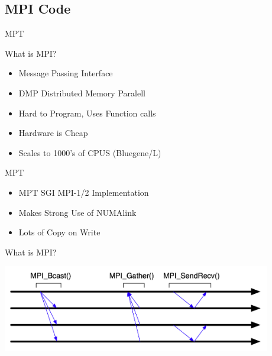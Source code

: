 \documentclass[handout]{beamer}
\begin{document}
\subsection{MPI Code}
\begin{frame}{MPT}
  \begin{block}{What is MPI?}
   \begin{itemize}
    \item <1->Message Passing Interface
    \item <2->DMP Distributed Memory Paralell
    \item <3->Hard to Program, Uses Function calls
    \item <4->Hardware is Cheap
    \item <5->Scales to 1000's of CPUS (Bluegene/L)
   \end{itemize}
  \end{block}
  \begin{block}{MPT}
   \begin{itemize}
    \item <6-> MPT SGI MPI-1/2 Implementation
    \item <7-> Makes Strong Use of NUMAlink
    \item <8-> Lots of Copy on Write
   \end{itemize}
  \end{block}
\end{frame}

\begin{frame}{What is MPI?}
   \begin{center}\includegraphics[height=1.5in]{mpi}\end{center}
\end{frame}
\end{document}
